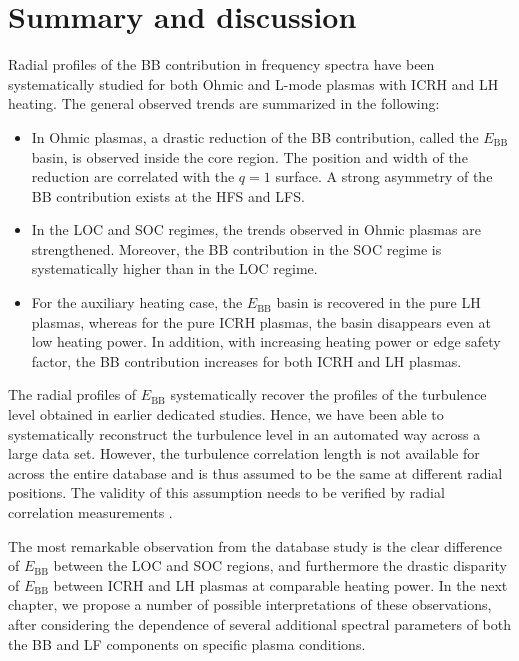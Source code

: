 \section{Summary and discussion} \label{summary_discussion}

Radial profiles of the BB contribution in frequency spectra have been systematically studied for both Ohmic and L-mode plasmas with ICRH and LH heating. The general observed trends are summarized in the following:
\begin{itemize}

  \item In Ohmic plasmas, a drastic reduction of the BB contribution, called the $E_\mathrm{BB}$ basin, is observed inside the core region. The position and width of the reduction are correlated with the $q = 1$ surface. A strong asymmetry of the BB contribution exists at the HFS and LFS.

  \item In the LOC and SOC regimes, the trends observed in Ohmic plasmas are strengthened. Moreover, the BB contribution in the SOC regime is systematically higher than in the LOC regime.

  \item For the auxiliary heating case, the $E_\mathrm{BB}$ basin is recovered in the pure LH plasmas, whereas for the pure ICRH plasmas, the basin disappears even at low heating power. In addition, with increasing heating power or edge safety factor, the BB contribution increases for both ICRH and LH plasmas.

\end{itemize}

The radial profiles of $E_\mathrm{BB}$ systematically recover the profiles of the turbulence level obtained in earlier dedicated studies. Hence, we have been able to systematically reconstruct the turbulence level in an automated way across a large data set. However, the turbulence correlation length is not available for across the entire database and is thus assumed to be the same at different radial positions. The validity of this assumption needs to be verified by radial correlation measurements \cite{Kosolapova_2012_PPCF}.

The most remarkable observation from the database study is the clear difference of $E_\mathrm{BB}$ between the LOC and SOC regions, and furthermore the drastic disparity of $E_\mathrm{BB}$ between ICRH and LH plasmas at comparable heating power. In the next chapter, we propose a number of possible interpretations of these observations, after considering the dependence of several additional spectral parameters of both the BB and LF components on specific plasma conditions.
